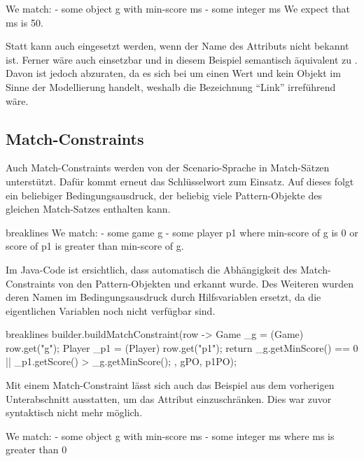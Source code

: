 \begin{mdcodeblock}
    We match:
    - some object g with min-score ms
    - some integer ms
    We expect that ms is 50.
\end{mdcodeblock}

Statt  kann auch  eingesetzt werden, wenn der Name des Attributs nicht bekannt ist.
Ferner wäre auch  einsetzbar und in diesem Beispiel semantisch äquivalent zu .
Davon ist jedoch abzuraten, da es sich bei  um einen Wert und kein Objekt im Sinne der Modellierung handelt, weshalb die Bezeichnung ``Link'' irreführend wäre.

\subsection{Match-Constraints}

Auch Match-Constraints werden von der Scenario-Sprache in Match-Sätzen unterstützt.
Dafür kommt erneut das Schlüsselwort  zum Einsatz.
Auf dieses folgt ein beliebiger Bedingungsausdruck, der beliebig viele Pattern-Objekte des gleichen Match-Satzes enthalten kann.

\begin{mdcodeblock*}{breaklines}
    We match:
    - some game g
    - some player p1
    where min-score of g is 0 or score of p1 is greater than min-score of g.
\end{mdcodeblock*}

Im Java-Code ist ersichtlich, dass automatisch die Abhängigkeit des Match-Constraints von den Pattern-Objekten  und  erkannt wurde.
Des Weiteren wurden deren Namen im Bedingungsausdruck durch Hilfsvariablen ersetzt, da die eigentlichen Variablen noch nicht verfügbar sind.

\begin{jcodeblock*}{breaklines}
    builder.buildMatchConstraint(row -> {
        Game _g = (Game) row.get("g");
        Player _p1 = (Player) row.get("p1");
        return _g.getMinScore() == 0 || _p1.getScore() > _g.getMinScore();
    }, gPO, p1PO);
\end{jcodeblock*}

Mit einem Match-Constraint lässt sich auch das Beispiel aus dem vorherigen Unterabschnitt ausstatten, um das Attribut  einzuschränken.
Dies war zuvor syntaktisch nicht mehr möglich.

\begin{mdcodeblock}
    We match:
    - some object g with min-score ms
    - some integer ms where ms is greater than 0
\end{mdcodeblock}
